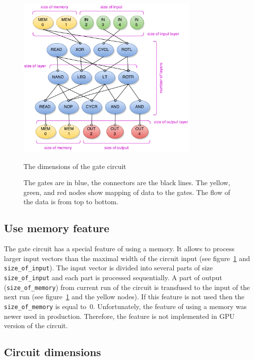 \documentclass[12pt,twoside]{fithesis2}
\begin{document}
\begin{figure}[h]
	\centering
	\includegraphics[width=0.8\textwidth]{figures/gate_circuit.pdf}
	\caption{The dimensions of the gate circuit}
	\caption*{The gates are in blue, the connectors are the black lines. The yellow, green, and red nodes show mapping of data to the gates. The flow of the data is from top to bottom.}
	\label{fig:gate_circuit}
\end{figure}

\subsection{Use memory feature}

The gate circuit has a special feature of using a memory. It allows to process larger input vectors than the maximal width of the circuit input (see figure~\ref{fig:gate_circuit} and \texttt{size\_of\_input}). The input vector is divided into several parts of size \texttt{size\_of\_input} and each part is processed sequentially. A part of output (\texttt{size\_of\_memory}) from current run of the circuit is transfused to the input of the next run (see figure~\ref{fig:gate_circuit} and the yellow nodes). If this feature is not used then the \texttt{size\_of\_memory} is equal to~$0$. Unfortunately, the feature of using a memory was newer used in production. Therefore, the feature is not implemented in GPU version of the circuit.

\subsection{Circuit dimensions}
\end{document}
